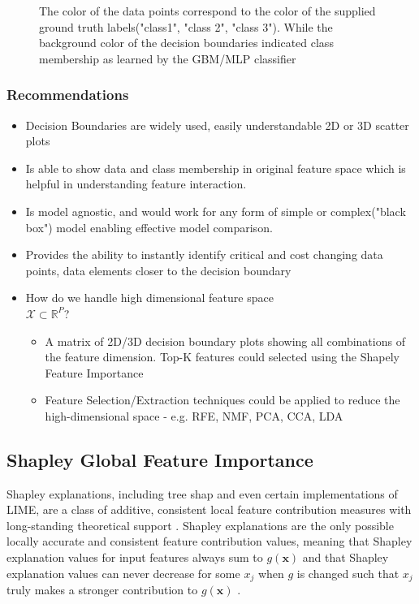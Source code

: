 \documentclass{article}
\begin{document}
\begin{figure}[htb]
\begin{subfigure}[tb]{.5\textwidth}
\begin{center}
			\caption{}
			\label{fig:global_db}
		\end{center}
	\end{subfigure}%
	\caption{The color of the data points correspond to the color of the supplied ground truth labels("class1", "class 2", "class 3"). While the background color of the decision boundaries indicated class membership as learned by the GBM/MLP classifier}
\end{figure}

\subsubsection{Recommendations}
\begin{itemize}
	\item Decision Boundaries are widely used, easily understandable 2D or 3D scatter plots \cite{migut2015visualizing}
	\item Is able to show data and class membership in original feature space which is helpful in understanding feature interaction.
	\item Is model agnostic, and would work for any form of simple or complex("black box") model enabling effective model comparison.
	\item Provides the ability to instantly identify critical and cost changing data points, data elements closer to the decision boundary
	\item How do we handle high dimensional feature space \\ $\mathcal{X} \subset \mathbb{R}^P$?
	\begin{itemize}
		\item A matrix of 2D/3D decision boundary plots showing all combinations of the feature dimension. Top-K features could selected using the Shapely Feature Importance
		\item Feature Selection/Extraction techniques could be applied to reduce the high-dimensional space - e.g. RFE, NMF, PCA, CCA, LDA
	\end{itemize}
\end{itemize}


\subsection{Shapley Global Feature Importance}

Shapley explanations, including tree shap and even certain implementations of LIME, are a class of additive, consistent local feature contribution measures with long-standing theoretical support \cite{shapley}. Shapley explanations are the only possible locally accurate and consistent feature contribution values, meaning that Shapley explanation values for input features always sum to $g(\mathbf{x})$ and that Shapley explanation values can never decrease for some $x_j$ when $g$ is changed such that $x_j$ truly makes a stronger contribution to $g(\mathbf{x})$ \cite{shapley}. 
\end{document}
